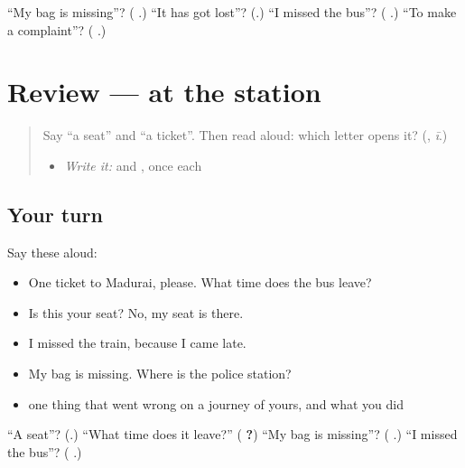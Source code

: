 \begin{tcolorbox}[breakable,colback=teal!4,colframe=teal!35!black,title={Before you move on}]
\textquotedblleft{}My bag is missing\textquotedblright{}? (\textbf{  }.) \textquotedblleft{}It has got lost\textquotedblright{}? (\textbf{}.) \textquotedblleft{}I missed the bus\textquotedblright{}? (\textbf{ }.) \textquotedblleft{}To make a complaint\textquotedblright{}? (\textbf{ }.)
\end{tcolorbox}
\section[(review)]{Review — at the station}

\label{lesson:TA-R289-at-the-station}



\begin{quote}
Say \textquotedblleft{}a seat\textquotedblright{} and \textquotedblleft{}a ticket\textquotedblright{}. Then read \textbf{} aloud: which letter opens it? (\textbf{}, \emph{ī}.)

\begin{itemize}
\raggedright
  \item \emph{Write it:} \textbf{} and \textbf{}, once each
\end{itemize}
\end{quote}

\subsection*{Your turn}
Say these aloud:

\begin{itemize}
\raggedright
  \item One ticket to Madurai, please. What time does the bus leave?
  \item Is this your seat? No, my seat is there.
  \item I missed the train, because I came late.
  \item My bag is missing. Where is the police station?
  \item one thing that went wrong on a journey of yours, and what you did
\end{itemize}

\begin{tcolorbox}[breakable,colback=teal!4,colframe=teal!35!black,title={Before you move on}]
\textquotedblleft{}A seat\textquotedblright{}? (\textbf{}.) \textquotedblleft{}What time does it leave?\textquotedblright{} (\textbf{  ?}) \textquotedblleft{}My bag is missing\textquotedblright{}? (\textbf{  }.) \textquotedblleft{}I missed the bus\textquotedblright{}? (\textbf{ }.)
\end{tcolorbox}

